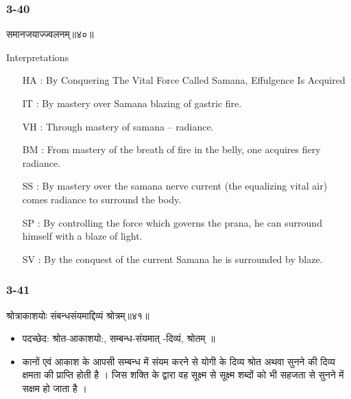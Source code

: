 \begin{frame}[fragile]\frametitle{3-40}
\begin{sanskrit}
समानजयाज्ज्वलनम्॥४०॥
\end{sanskrit}

Interpretations
\begin{itemize}	
\item [HA]: By Conquering The Vital Force Called Samana, Effulgence Is Acquired
\item [IT]: By mastery over Samana blazing of gastric fire.
\item [VH]: Through mastery of samana – radiance.
\item [BM]: From mastery of the breath of fire in the belly, one acquires fiery radiance.
\item [SS]: By mastery over the samana nerve current (the equalizing vital air) comes radiance to surround the body.
\item [SP]: By controlling the force which governs the prana, he can surround himself with a blaze of light.
\item [SV]: By the conquest of the current Samana he is surrounded by blaze. 
\end{itemize}
\end{frame}

\begin{frame}[fragile]\frametitle{3-41}
\begin{sanskrit}
श्रोत्राकाशयोः संबन्धसंयमाद्दिव्यं श्रोत्रम्॥४१॥
\end{sanskrit}

\begin{itemize}
\item पदच्छेद:   श्रोत-आकाशयो:, सम्बन्ध-संयमात् -दिव्यं, श्रोतम् ॥
\item कानों एवं आकाश के आपसी सम्बन्ध में संयम करने से योगी के दिव्य श्रोत अथवा सुनने की दिव्य क्षमता की प्राप्ति होती है । जिस शक्ति के द्वारा वह सूक्ष्म से सूक्ष्म शब्दों को भी सहजता से सुनने में सक्षम हो जाता है ।
\end{itemize}
\end{frame}


